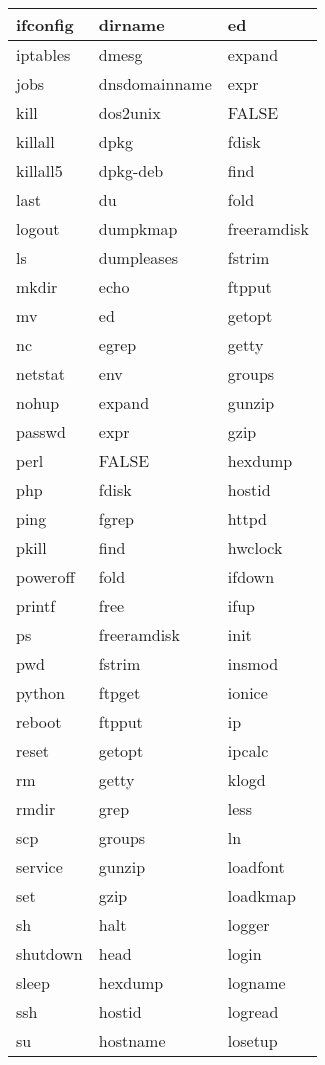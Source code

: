\begin{longtable}{llp{64mm}}
ifconfig & dirname & ed \\ \hline
iptables & dmesg & expand \\ \hline
jobs & dnsdomainname & expr \\ \hline
kill & dos2unix & FALSE \\ \hline
killall & dpkg & fdisk \\ \hline
killall5 & dpkg-deb & find \\ \hline
last & du & fold \\ \hline
logout & dumpkmap & freeramdisk \\ \hline
ls & dumpleases & fstrim \\ \hline
mkdir & echo & ftpput \\ \hline
mv & ed & getopt \\ \hline
nc & egrep & getty \\ \hline
netstat & env & groups \\ \hline
nohup & expand & gunzip \\ \hline
passwd & expr & gzip \\ \hline
perl & FALSE & hexdump \\ \hline
php & fdisk & hostid \\ \hline
ping & fgrep & httpd \\ \hline
pkill & find & hwclock \\ \hline
poweroff & fold & ifdown \\ \hline
printf & free & ifup \\ \hline
ps & freeramdisk & init \\ \hline
pwd & fstrim & insmod \\ \hline
python & ftpget & ionice \\ \hline
reboot & ftpput & ip \\ \hline
reset & getopt & ipcalc \\ \hline
rm & getty & klogd \\ \hline
rmdir & grep & less \\ \hline
scp & groups & ln \\ \hline
service & gunzip & loadfont \\ \hline
set & gzip & loadkmap \\ \hline
sh & halt & logger \\ \hline
shutdown & head & login \\ \hline
sleep & hexdump & logname \\ \hline
ssh & hostid & logread \\ \hline
su & hostname & losetup \\ \hline

\end{longtable}
